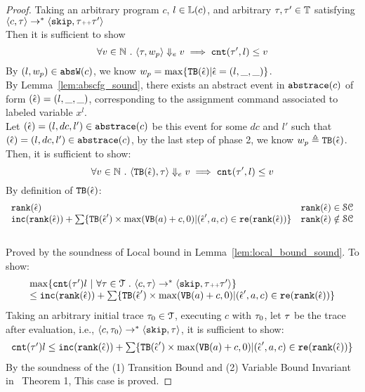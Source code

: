 \begin{proof}
  Taking an arbitrary program ${c}$, $l \in \mathbb{L}(c)$,
  and arbitrary $\mathtt{\tau}, \mathtt{\tau}' \in \mathbb{T}$ satisfying
  \\
  $\langle {c}, \mathtt{\tau} \rangle 
  \to^{*} \langle \mathtt{skip}, \mathtt{\tau}{\scriptscriptstyle ++}\mathtt{\tau}' \rangle 
  $
  \\
  Then it is sufficient to show 
  \[
    \forall v \in \mathbb{N}
    ~.~ \langle \mathtt{\tau}, w_p \rangle \Downarrow_e v \implies
    \mathtt{cnt}(\mathtt{\tau}', l) \leq v
    \]
  By $(l, w_p) \in \mathtt{abs}{\mathtt{W}}(c)$, we know 
  $  w_p = \max \{ {\mathtt{TB}}(\hat{\mathtt{\epsilon}{}}) | \hat{\mathtt{\epsilon}{}} = (l, \_, \_)\}$.
  \\
  By Lemma~\ref{lem:abscfg_sound}, there exists an abstract event in $\mathtt{abs}{\mathtt{trace}}(c)$ of form $(\hat{\mathtt{\epsilon}{}}) = (l, \_, \_)$,
  corresponding to the assignment command associated to labeled variable $x^l$. 
  \\
  Let $(\hat{\mathtt{\epsilon}{}}) = (l, dc, l') \in \mathtt{abs}{\mathtt{trace}}(c)$ be this event for some $dc$ and $l'$ such that  $(\hat{\mathtt{\epsilon}{}}) = (l, dc, l') \in \mathtt{abs}{\mathtt{trace}}(c)$,
  by the last step of phase 2, we know
  $
  w_p  \triangleq {\ensuremath{\mathtt{TB}}}(\hat{\mathtt{\epsilon}{}})
  $.
   Then, it is sufficient to show:
  \[
  \forall v \in \mathbb{N} ~.~ 
  \langle {\ensuremath{\mathtt{TB}}}(\hat{\mathtt{\epsilon}{}}), \mathtt{\tau} \rangle \Downarrow_e v \implies
  \mathtt{cnt}(\mathtt{\tau}', l) \leq v
  \]
  By definition of ${\mathtt{TB}}(\hat{\mathtt{\epsilon}{}})$:
  \[
 \begin{array}{ll}
  \mathtt{rank}(\hat{\mathtt{\epsilon}{}}) & \mathtt{rank}(\hat{\mathtt{\epsilon}{}}) \in \mathcal{SC} \\
  \mathtt{inc}(\mathtt{rank}(\hat{\mathtt{\epsilon}{}})) + 
  \sum\{{\mathtt{TB}}(\hat{\mathtt{\epsilon}{}}') \times \max({\mathtt{VB}}(a) + c, 0) | (\hat{\mathtt{\epsilon}{}}', a, c) \in \mathtt{re}(\mathtt{rank}(\hat{\mathtt{\epsilon}{}}))\} 
  & \mathtt{rank}(\hat{\mathtt{\epsilon}{}}) \notin \mathcal{SC}
\end{array}
\]
  \caseL{$\locbound(\absevent) \in \constdom$}
  \\
  Proved by the soundness of Local bound in Lemma~\ref{lem:local_bound_sound}.
  \caseL{$\locbound(\absevent) \notin \constdom$}
To show:
\[
  \begin{array}{l}
    \max \left\{ \counter(\vtrace') l ~ \middle\vert~
\forall \vtrace \in \mathcal{T} \st \config{{c}, \trace} \to^{*} \config{\eskip, \trace\tracecat\vtrace'} \right\} 
\\
\leq 
\inc(\locbound(\absevent)) + 
\sum\{\absclr(\absevent') \times \max(\varinvar(a) + c, 0) | (\absevent', a, c) \in \reset(\locbound(\absevent))\} 
\end{array}
\]
  Taking an arbitrary initial trace
  $\mathtt{\tau}_0 \in \mathcal{T}$, 
  executing $c$ with $\mathtt{\tau}_0$, let $\mathtt{\tau}$ be the trace after evaluation, i.e., $\langle {c}, \mathtt{\tau}_0 \rangle \to^{*} \langle \mathtt{skip},\mathtt{\tau} \rangle$, it is sufficient to show:
  \[ 
    \begin{array}{l}
      \mathtt{cnt}(\mathtt{\tau}') l \leq 
    \mathtt{inc}(\mathtt{rank}(\hat{\mathtt{\epsilon}{}})) + 
    \sum\{{\mathtt{TB}}(\hat{\mathtt{\epsilon}{}}') \times \max({\mathtt{VB}}(a) + c, 0) | (\hat{\mathtt{\epsilon}{}}', a, c) \in \mathtt{re}(\mathtt{rank}(\hat{\mathtt{\epsilon}{}}))\}
  \end{array}
  \]
%
 By the soundness of the (1) Transition Bound and (2) Variable Bound Invariant 
 in~\cite{sinn2017complexity} Theorem 1, 
This case is proved.
\end{proof}


%